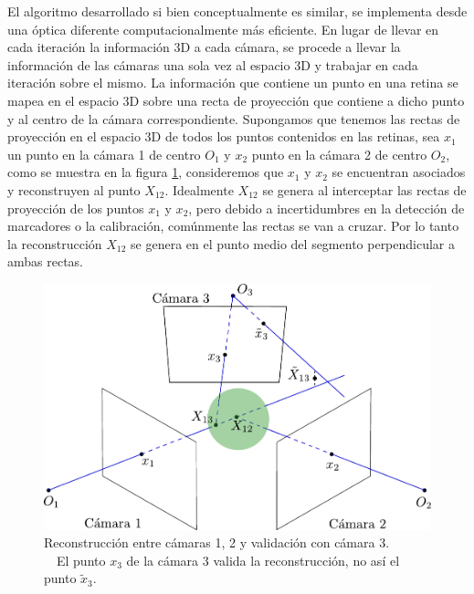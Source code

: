 El algoritmo desarrollado si bien conceptualmente es similar, se implementa desde una óptica diferente computacionalmente más eficiente.
En lugar de llevar en cada iteración la información 3D a cada cámara, se procede a llevar la información de las cámaras una sola vez al espacio 3D y trabajar en cada iteración sobre el mismo. La información que contiene un punto en una retina se mapea en el espacio 3D sobre una recta de proyección que contiene a dicho punto y al centro de la cámara correspondiente. Supongamos que tenemos las rectas de proyección en el espacio 3D de todos los puntos contenidos en las retinas, sea $x_1$ un punto en la cámara 1 de centro $O_1$ y $x_2$ punto en la cámara 2 de centro $O_2$, como se muestra en la figura \ref{img_reconstruccion_validacion}, consideremos que $x_1$ y $x_2$ se encuentran asociados y reconstruyen al punto $X_{12}$. Idealmente $X_{12}$ se genera al interceptar las rectas de proyección de los puntos $x_1$ y $x_2$, pero debido a incertidumbres en la detección de marcadores o la calibración, comúnmente las rectas se van a cruzar. Por lo tanto la reconstrucción $X_{12}$ se genera en el punto medio del segmento perpendicular a ambas rectas.


\begin{figure}[h!]
\centering
\captionsetup{justification=centering,margin=2.8cm}
\includegraphics[scale=0.7]{img/Reconstruccion/validacion.pdf}
\caption{Reconstrucción entre cámaras 1, 2 y validación con cámara 3. \\ ~~El punto $x_3$ de la cámara 3 valida la reconstrucción, no así el punto $\tilde{x}_3$.}
\label{img_reconstruccion_validacion}
\end{figure}

